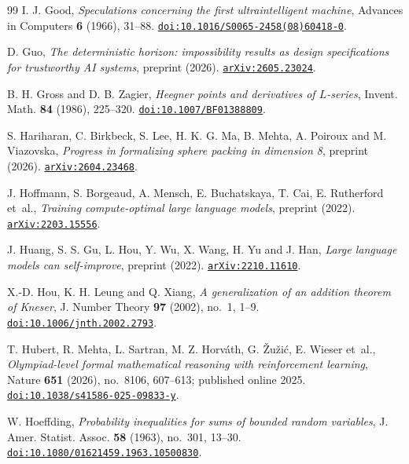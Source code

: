 \begin{thebibliography}{99}
I. J. Good,
\emph{Speculations concerning the first ultraintelligent machine},
Advances in Computers \textbf{6} (1966), 31--88.
\href{https://doi.org/10.1016/S0065-2458(08)60418-0}{\nolinkurl{doi:10.1016/S0065-2458(08)60418-0}}.

D. Guo,
\emph{The deterministic horizon: impossibility results as design specifications for trustworthy AI systems},
preprint (2026).
\href{https://arxiv.org/abs/2605.23024}{\nolinkurl{arXiv:2605.23024}}.

B. H. Gross and D. B. Zagier,
\emph{Heegner points and derivatives of $L$-series},
Invent. Math. \textbf{84} (1986), 225--320.
\href{https://doi.org/10.1007/BF01388809}{\nolinkurl{doi:10.1007/BF01388809}}.

S. Hariharan, C. Birkbeck, S. Lee, H. K. G. Ma, B. Mehta, A. Poiroux and M. Viazovska,
\emph{Progress in formalizing sphere packing in dimension 8},
preprint (2026).
\href{https://arxiv.org/abs/2604.23468}{\nolinkurl{arXiv:2604.23468}}.

J. Hoffmann, S. Borgeaud, A. Mensch, E. Buchatskaya, T. Cai, E. Rutherford et~al.,
\emph{Training compute-optimal large language models},
preprint (2022).
\href{https://arxiv.org/abs/2203.15556}{\nolinkurl{arXiv:2203.15556}}.

J. Huang, S. S. Gu, L. Hou, Y. Wu, X. Wang, H. Yu and J. Han,
\emph{Large language models can self-improve},
preprint (2022).
\href{https://arxiv.org/abs/2210.11610}{\nolinkurl{arXiv:2210.11610}}.

X.-D. Hou, K. H. Leung and Q. Xiang,
\emph{A generalization of an addition theorem of Kneser},
J. Number Theory \textbf{97} (2002), no.~1, 1--9.
\href{https://doi.org/10.1006/jnth.2002.2793}{\nolinkurl{doi:10.1006/jnth.2002.2793}}.

T. Hubert, R. Mehta, L. Sartran, M. Z. Horv\'ath, G. \v{Z}u\v{z}i\'c, E. Wieser et~al.,
\emph{Olympiad-level formal mathematical reasoning with reinforcement learning},
Nature \textbf{651} (2026), no.~8106, 607--613; published online 2025.
\href{https://doi.org/10.1038/s41586-025-09833-y}{\nolinkurl{doi:10.1038/s41586-025-09833-y}}.

W. Hoeffding,
\emph{Probability inequalities for sums of bounded random variables},
J. Amer. Statist. Assoc. \textbf{58} (1963), no.~301, 13--30.
\href{https://doi.org/10.1080/01621459.1963.10500830}{\nolinkurl{doi:10.1080/01621459.1963.10500830}}.


\end{thebibliography}
